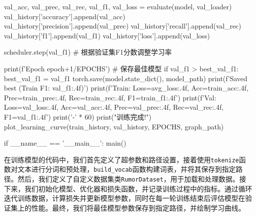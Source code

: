 \begin{codeblock}[language=Python]
        val_acc, val_prec, val_rec, val_f1, val_loss = evaluate(model, val_loader)
        val_history['accuracy'].append(val_acc)
        val_history['precision'].append(val_prec)
        val_history['recall'].append(val_rec)
        val_history['f1'].append(val_f1)
        val_history['loss'].append(val_loss)
        
        scheduler.step(val_f1)  # 根据验证集F1分数调整学习率
        
        print(f'Epoch {epoch+1}/{EPOCHS}')
        # 保存最佳模型
        if val_f1 > best_val_f1:
            best_val_f1 = val_f1
            torch.save(model.state_dict(), model_path)
            print(f'Saved best (Train F1: {val_f1:.4f})')
        print(f'Train: Loss={avg_loss:.4f}, Acc={train_acc:.4f}, Prec={train_prec:.4f}, Rec={train_rec:.4f}, F1={train_f1:.4f}')
        print(f'Val: Loss={val_loss:.4f}, Acc={val_acc:.4f}, Prec={val_prec:.4f}, Rec={val_rec:.4f}, F1={val_f1:.4f}')
        print('-' * 60)
    print("\n 训练完成!")
    plot_learning_curve(train_history, val_history, EPOCHS, graph_path)
    
if __name__ == '__main__':
    main()
\end{codeblock}

在训练模型的代码中，我们首先定义了超参数和路径设置，接着使用\verb|tokenize|函数对文本进行分词和预处理，\verb|build_vocab|函数构建词表，并将其保存到指定路径。然后，我们定义了自定义数据集类\verb|RumorDataset|，用于加载和处理数据。接下来，我们初始化模型、优化器和损失函数，并记录训练过程中的指标。通过循环迭代训练数据，计算损失并更新模型参数，同时在每一轮训练结束后评估模型在验证集上的性能。最终，我们将最佳模型参数保存到指定路径，并绘制学习曲线。

\vspace{1em}
